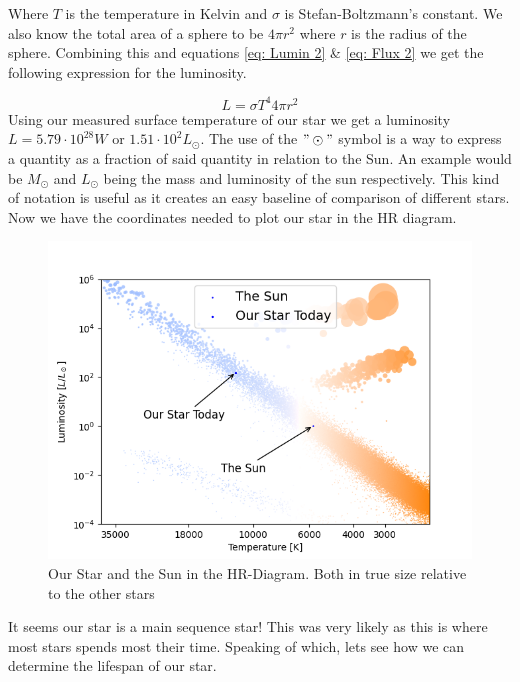 \documentclass[reprint,english,notitlepage]{revtex4-2}
\begin{document}
Where $ T $ is the temperature in Kelvin and $ \sigma  $ is Stefan-Boltzmann's constant. We also know the total area of a sphere to be $ 4 \pi r^{2} $  where $ r $ is the radius of the sphere. Combining this and equations \ref{eq: Lumin 2} \& \ref{eq: Flux 2} we get the following expression for the luminosity.

\begin{equation} \label{eq: Luminosity final}
  L = σT^{4} 4 π r^{2}
\end{equation}
Using our measured surface temperature of our star we get a luminosity $ L = 5.79 \cdot 10^{28} W$  or $ 1.51 \cdot 10^{2} L_{\odot} $. The use of the  $ "\odot" $ symbol is a way to express a quantity as a fraction of said quantity in relation to the Sun. An example would be $ M_{⊙} $ and $ L_{⊙} $ being the mass and luminosity of the sun respectively. This kind of notation is useful as it creates an easy baseline of comparison of different stars.
Now we have the coordinates needed to plot our star in the HR diagram. 
\begin{figure}[h!]
  \centering
  \includegraphics[scale = .5]{figures/HR_diagram_Sun and Star}
  \caption{Our Star and the Sun in the HR-Diagram. Both in true size relative to the other stars}
  \label{fig: HR_Diagram_Today}
\end{figure}
It seems our star is a main sequence star! This was very likely as this is where most stars spends most their time. Speaking of which, lets see how we can determine the lifespan of our star. 
\end{document}
